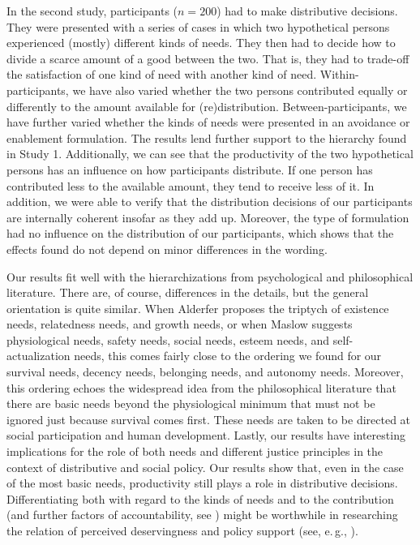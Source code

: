 \documentclass[10pt,letterpaper]{article}
\begin{document}
In the second study, participants ($n=200$) had to make distributive decisions.
They were presented with a series of cases in which two hypothetical persons experienced (mostly) different kinds of needs.
They then had to decide how to divide a scarce amount of a good between the two.
That is, they had to trade-off the satisfaction of one kind of need with another kind of need.
Within-participants, we have also varied whether the two persons contributed equally or differently to the amount available for (re)distribution.
Between-participants, we have further varied whether the kinds of needs were presented in an avoidance or enablement formulation.
The results lend further support to the hierarchy found in Study 1.
Additionally, we can see that the productivity of the two hypothetical persons has an influence on how participants distribute.
If one person has contributed less to the available amount, they tend to receive less of it.
In addition, we were able to verify that the distribution decisions of our participants are internally coherent insofar as they add up.
Moreover, the type of formulation had no influence on the distribution of our participants, which shows that the effects found do not depend on minor differences in the wording.

Our results fit well with the hierarchizations from psychological and philosophical literature.
There are, of course, differences in the details, but the general orientation is quite similar.
When Alderfer proposes the triptych of existence needs, relatedness needs, and growth needs, or when Maslow suggests physiological needs, safety needs, social needs, esteem needs, and self-actualization needs, this comes fairly close to the ordering we found for our survival needs, decency needs, belonging needs, and autonomy needs.
Moreover, this ordering echoes the widespread idea from the philosophical literature that there are basic needs beyond the physiological minimum that must not be ignored just because survival comes first.
These needs are taken to be directed at social participation and human development.
Lastly, our results have interesting implications for the role of both needs and different justice principles in the context of distributive and social policy.
Our results show that, even in the case of the most basic needs, productivity still plays a role in distributive decisions.
Differentiating both with regard to the kinds of needs and to the contribution (and further factors of accountability, see \cite{bauer_need_2022}) might be worthwhile in researching the relation of perceived deservingness and policy support (see, e.\,g., \cite{gielens_deservingness_2019,heuer_unravelling_2020}).
\end{document}

